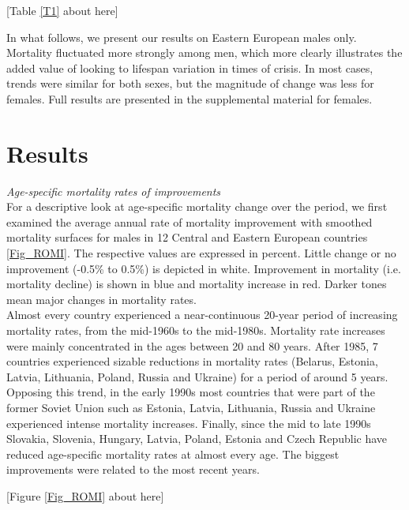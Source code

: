 \documentclass{article}
\begin{document}
\begin{spacing}{1.5}
\begin{center}
[Table \ref{T1} about here]
\end{center}



In what follows, we present our results on Eastern European males only. Mortality fluctuated more strongly among men, which more clearly illustrates the added value of looking to lifespan variation in times of crisis. In most cases, trends were similar for both sexes, but the magnitude of change was less for females. Full results are presented in the supplemental material for females.



\section*{Results}
\emph{Age-specific mortality rates of improvements}\\

For a descriptive look at age-specific mortality change over the period, we first examined the average annual rate of mortality improvement \citep{Rau2013} with smoothed mortality surfaces \citep{Camarda2012} for males in 12 Central and Eastern European countries \ref{Fig_ROMI}. The respective values are expressed in percent. Little change or no improvement (-0.5\% to 0.5\%) is depicted in white. Improvement in mortality (i.e. mortality decline) is shown in blue and mortality increase in red. Darker tones mean major changes in mortality rates.\\

Almost every country experienced a near-continuous 20-year period of increasing mortality rates, from the mid-1960s to the mid-1980s. Mortality rate increases were mainly concentrated in the ages between 20 and 80 years. After 1985, 7 countries experienced sizable reductions in mortality rates (Belarus, Estonia, Latvia, Lithuania, Poland, Russia and Ukraine) for a period of around 5 years. Opposing this trend, in the early 1990s most countries that were part of the former Soviet Union such as Estonia, Latvia, Lithuania, Russia and Ukraine experienced intense mortality increases. Finally, since the mid to late 1990s Slovakia, Slovenia, Hungary, Latvia, Poland, Estonia and Czech Republic have reduced age-specific mortality rates at almost every age. The biggest improvements were related to the most recent years.\\



\begin{center}
[Figure \ref{Fig_ROMI} about here]
\end{center}


\end{spacing}
\end{document}
